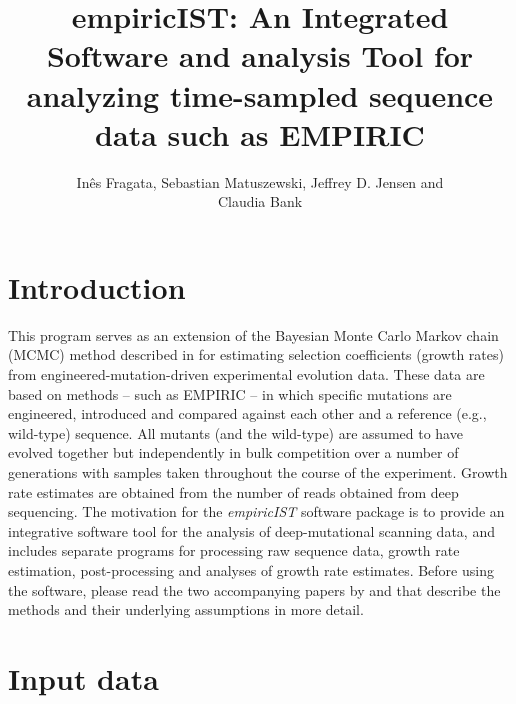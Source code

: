 \documentclass[12pt,a4paper]{scrartcl}
\begin{document}
 \titlehead{empiricIST: An Integrated Software and analysis Tool for analyzing time-sampled sequence data such as EMPIRIC}
  \subject{README}
  \title{empiricIST: An Integrated Software and analysis Tool for analyzing time-sampled sequence data such as EMPIRIC}
  \author{In\^{e}s Fragata, Sebastian Matuszewski, Jeffrey D. Jensen and\\ Claudia Bank}
\begingroup
 \makeatletter
 \@titlepagetrue
 \maketitle
\endgroup
\newpage
\tableofcontents
\newpage

\section{Introduction}


This program serves as an extension of the Bayesian Monte Carlo Markov chain (MCMC) method described in \cite{BanHW14} for estimating selection coefficients (growth rates) from engineered-mutation-driven experimental evolution data. These data are based on methods -- such as EMPIRIC -- in which specific mutations are engineered, introduced and compared against each other and a reference (e.g., wild-type) sequence. All mutants (and the wild-type) are assumed to have evolved together but independently in bulk competition over a number of generations with samples taken throughout the course of the experiment. Growth rate estimates are obtained from the number of reads obtained from deep sequencing.
The motivation for the \emph{empiricIST} software package is to provide an integrative software tool for the analysis of deep-mutational scanning data, and includes separate programs for processing raw sequence data, growth rate estimation, post-processing and analyses of growth rate estimates.
Before using the software, please read the two accompanying papers by \cite{BanHW14} and \cite{FraMJ17} that describe the methods and their underlying assumptions in more detail.

\section{Input data}
\end{document}
